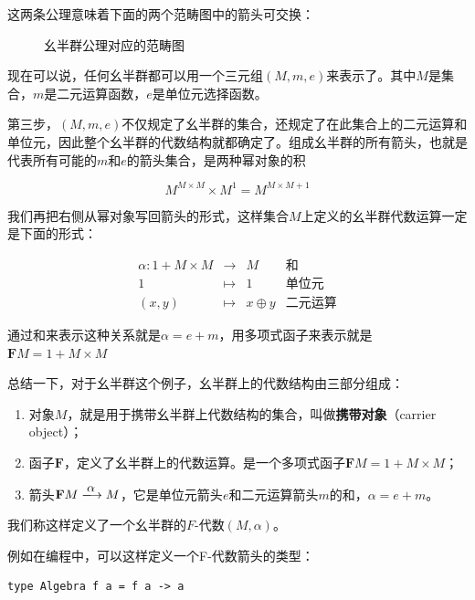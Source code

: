 \documentclass[b5paper]{ctexart}
\begin{document}
\begin{example}
这两条公理意味着下面的两个范畴图中的箭头可交换：

\begin{figure}[htbp]
\centering
{}
\quad
{}
\caption{幺半群公理对应的范畴图}
\end{figure}

现在可以说，任何幺半群都可以用一个三元组$(M, m, e)$来表示了。其中$M$是集合，$m$是二元运算函数，$e$是单位元选择函数。

第三步，$(M, m, e)$不仅规定了幺半群的集合，还规定了在此集合上的二元运算和单位元，因此整个幺半群的代数结构就都确定了。组成幺半群的所有箭头，也就是代表所有可能的$m$和$e$的箭头集合，是两种幂对象的积

\[
M^{M \times M} \times M^1 = M^{M \times M + 1}
\]

我们再把右侧从幂对象写回箭头的形式，这样集合$M$上定义的幺半群代数运算一定是下面的形式：

\[
\begin{array}{rcll}
\alpha : 1 + M \times M & \longrightarrow & M & \text{和}\\
1 & \longmapsto & 1 & \text{单位元}  \\
(x, y) & \longmapsto & x \oplus y & \text{二元运算}
\end{array}
\]

通过和来表示这种关系就是$\alpha = e + m$，用多项式函子来表示就是$\mathbf{F} M = 1 + M \times M$

总结一下，对于幺半群这个例子，幺半群上的代数结构由三部分组成：

\begin{enumerate}
  \item 对象$M$，就是用于携带幺半群上代数结构的集合，叫做\textbf{携带对象}（carrier object）；
  \item 函子$\mathbf{F}$，定义了幺半群上的代数运算。是一个多项式函子$\mathbf{F} M = 1 + M \times M$；
  \item 箭头$\mathbf{F} M \arrowto{\alpha} M$，它是单位元箭头$e$和二元运算箭头$m$的和，$\alpha = e + m$。
\end{enumerate}

我们称这样定义了一个幺半群的$F$-代数$(M, \alpha)$。

例如在编程中，可以这样定义一个F-代数箭头的类型：

\begin{lstlisting}
type Algebra f a = f a -> a
\end{lstlisting}


\end{example}
\end{document}
